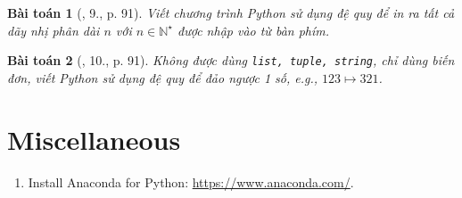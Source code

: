 \documentclass{article}
\newtheorem{baitoan}{Bài toán}
\begin{document}
\begin{baitoan}[\cite{Que_BT_Python}, 9., p. 91]
    Viết chương trình Python sử dụng đệ quy để in ra tất cả dãy nhị phân dài $n$ với $n\in\mathbb{N}^\star$ được nhập vào từ bàn phím.
\end{baitoan}

\begin{baitoan}[\cite{Que_BT_Python}, 10., p. 91]
    Không được dùng {\tt list, tuple, string}, chỉ dùng biến đơn, viết Python sử dụng đệ quy để đảo ngược 1 số, e.g., $123\mapsto321$.
\end{baitoan}


\section{Miscellaneous}

\begin{enumerate}
	\item Install Anaconda for Python: \url{https://www.anaconda.com/}.
\end{enumerate}


\printbibliography[heading=bibintoc]
	
\end{document}
